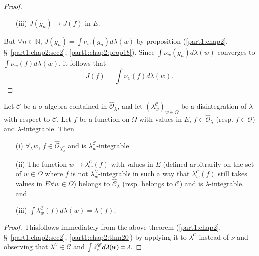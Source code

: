 \begin{proof}
\begin{itemize}
\item[{\rm (iii)}] \qquad $J(g_n) \to J(f) $ in $E$. 
\end{itemize}

But $\forall n \in \mathbb{N}$, $J(g_n) =\int \nu_w (g_n) d\lambda(w)$
by proposition (\ref{part1:chap2}, \S\ \ref{part1:chap2:sec2},
\ref{part1:chap2:prop18}). Since $\int \nu_w (g_n) d\lambda (w)$ 
converges to $\int \nu_w (f) d\lambda (w)$, it follows that 
\begin{equation*}
J(f) = \int\nu_w (f) d\lambda(w). 
\end{equation*}
\end{proof}

\begin{corollary}\label{part1:chap2:coro21}
Let $\mathscr{C}$ be a $\sigma$-algebra contained in
$\hat{\mathscr{O}}_\lambda$, and let
$(\lambda^\mathscr{C}_w)_{w\in\Omega}$ be a disintegration of
$\lambda$ with respect to $\mathscr{C}$. Let $f$ be a function on
$\Omega$ with values in $E$, $f \in \hat{\mathscr{O}}_\lambda$
(resp. $f \in \mathscr{O}$) and $\lambda$-integrable. Then 
\begin{itemize}
\item[{\rm (i)}] $\forall_\lambda w$, $f
  \in\hat{\mathscr{O}}_{\lambda^\mathscr{C}_w}$ and is
  $\lambda^\mathscr{C}_w$-integrable

\item[{\rm(ii)}] The function $w \to \lambda^\mathscr{C}_w(f)$ with
  values in $E$ (defined arbitrarily on the set of $w \in\Omega$ where
  $f$ is not $\lambda^\mathscr{C}_w$-integrable in such a way that
  $\lambda^\mathscr{C}_w (f)$ still takes values in $E \forall w
  \in\Omega$) belongs to $\hat{\mathscr{C}}_\lambda$ (resp. belongs to
  $\mathscr{C}$) and is $\lambda$-integrable. and 

\item[{\rm (iii)}] \qquad $\int \lambda^\mathscr{C}_w (f) d \lambda
(w) = \lambda (f)$. 
\end{itemize}
\end{corollary}

\begin{proof}
This\pageoriginale follows immediately from the above theorem (\ref{part1:chap2},
\S\ \ref{part1:chap2:sec2}, \ref{part1:chap2:thm20}) by applying it to
$\lambda^\mathscr{C}$ instead of $\nu$ 
and observing that $\lambda^\mathscr{C} \in \mathscr{C}$  and
$\int\lambda^\mathscr{C}_w\break d\lambda(w) = \lambda$.
\end{proof}

